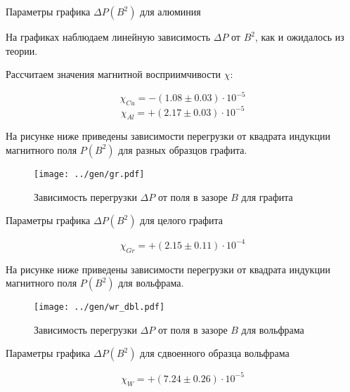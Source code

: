 \begin{table}[h]
	\caption{Параметры графика $\Delta P(B^2)$ для алюминия}
	
\end{table}

На графиках наблюдаем линейную зависимость $\Delta P$ от $B^2$, как и ожидалось из теории.

Рассчитаем значения магнитной восприимчивости $\chi$:

$$\chi_{Cu} = -(1.08 \pm 0.03) \cdot 10^{-5} $$
$$\chi_{Al} = +(2.17 \pm 0.03) \cdot 10^{-5} $$

На рисунке ниже приведены зависимости перегрузки от квадрата индукции магнитного поля $P(B^2)$ для разных образцов графита.

\begin{figure}[H]
	\texttt{[image: ../gen/gr.pdf]}
	\caption{Зависимость перегрузки $\Delta P$ от поля в зазоре $B$ для графита}
\end{figure}

\begin{table}[h]
	\caption{Параметры графика $\Delta P(B^2)$ для целого графита}
	
\end{table}

$$\chi_{Gr} = +(2.15 \pm 0.11) \cdot 10^{-4} $$

На рисунке ниже приведены зависимости перегрузки от квадрата индукции магнитного поля $P(B^2)$ для вольфрама.

\begin{figure}[H]
	\texttt{[image: ../gen/wr\_dbl.pdf]}
	\caption{Зависимость перегрузки $\Delta P$ от поля в зазоре $B$ для вольфрама}
\end{figure}

\begin{table}[h]
	\caption{Параметры графика $\Delta P(B^2)$ для сдвоенного образца вольфрама}
	
\end{table}

$$\chi_{W} = +(7.24 \pm 0.26) \cdot 10^{-5} $$
